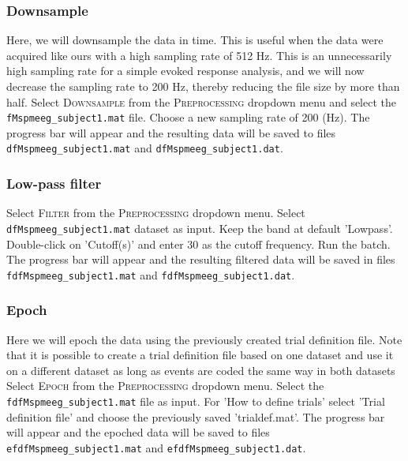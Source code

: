 \subsubsection{Downsample}
Here, we will downsample the data in time. This is useful when the data were acquired like ours with a high sampling rate of 512 Hz. This is an unnecessarily high sampling rate for a simple evoked response analysis, and we will now decrease the sampling rate to 200 Hz, thereby reducing the file size by more than half.  Select \textsc{Downsample} from the  \textsc{Preprocessing} dropdown menu and select the \texttt{fMspmeeg\_subject1.mat} file. Choose a new sampling rate of 200 (Hz). The progress bar will appear and the resulting data will be saved to files \texttt{dfMspmeeg\_subject1.mat} and \texttt{dfMspmeeg\_subject1.dat}.

\subsubsection{Low-pass filter}
 Select \textsc{Filter} from the \textsc{Preprocessing} dropdown menu. Select \texttt{dfMspmeeg\_subject1.mat} dataset as input.  Keep the band at default  'Lowpass'. Double-click on 'Cutoff(s)' and enter 30 as the cutoff frequency. Run the batch. The progress bar will appear and the resulting filtered data will be saved in files \texttt{fdfMspmeeg\_subject1.mat} and \texttt{fdfMspmeeg\_subject1.dat}.

\subsubsection{Epoch}
Here we will epoch the data using the previously created trial definition file. Note that it is possible to create a trial definition file based on one dataset and use it on a different dataset as long as events are coded the same way in both datasets  Select \textsc{Epoch} from the \textsc{Preprocessing} dropdown menu. Select the \texttt{fdfMspmeeg\_subject1.mat} file as input. For 'How to define trials' select 'Trial definition file' and choose the previously saved 'trialdef.mat'. The progress bar will appear and the epoched data will be saved to files \texttt{efdfMspmeeg\_subject1.mat} and \texttt{efdfMspmeeg\_subject1.dat}.

